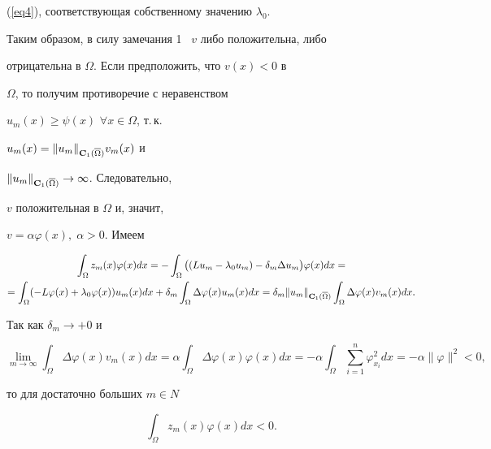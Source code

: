 (\ref{eq4}), соответствующая собственному значению $\lambda_0$.


Таким образом, в силу замечания 1 \ $v$ либо положительна, либо


отрицательна в $\Omega$. Если предположить, что $v(x)<0$ в


$\Omega$, то получим противоречие с неравенством


$u_m(x)\ge\psi(x)$ $\forall x\in\Omega$, т.\,к.\linebreak


$u_m(x)=\|u_m\|_{{\bold C}_1(\overline{\Omega})}v_m(x)$ и


$\|u_m\|_{{\bold C}_1(\overline{\Omega})}\to\infty$. Следовательно,


$v$ положительная в $\Omega$ и, значит,


$v=\alpha\varphi(x),\;\alpha>0$. Имеем


\begin{gather*}


\int_{\Omega}z_m(x)\varphi(x)dx=-\int_{\Omega}


\big((Lu_m-\lambda_0u_m)-\delta_m\Delta


u_m\big)\varphi(x)dx= \\


%


=\int_{\Omega}(-L\varphi(x)+\lambda_0\varphi(x))u_m(x)dx+


\delta_m\int_{\Omega}\Delta\varphi(x)u_m(x)dx=


%




\delta_m\|u_m\|_{{\bold C}_1(\overline{\Omega})}


\int_{\Omega}\Delta \varphi(x) v_m(x)dx.


\end{gather*}





Так как $\delta_m\to+0$ и


$$


\lim_{m\to\infty}\int_{\Omega}\Delta \varphi(x)v_m(x)dx=


\alpha\int_{\Omega}\Delta\varphi(x)\varphi(x)dx=


-\alpha\int_\Omega\sum_{i=1}^n\varphi_{x_i}^2dx=-\alpha\|\varphi\|^2<0,


$$


то для достаточно больших $m\in N$


\begin{equation}\label{eq12}


\int_{\Omega} {z_m(x) \varphi(x)dx} <  0.


\end{equation}





